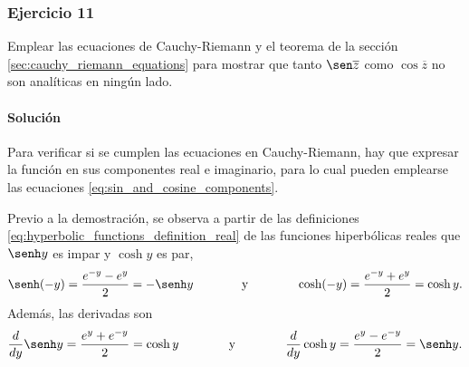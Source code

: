 \documentclass[a4paper]{report}
\begin{document}
\subsubsection{Ejercicio 11}

Emplear las ecuaciones de Cauchy-Riemann y el teorema de la sección \ref{sec:cauchy_riemann_equations} para mostrar que tanto \(\sen \overline{z}\) como \(\cos \overline{z}\) no son analíticas en ningún lado.

\paragraph{Solución} Para verificar si se cumplen las ecuaciones en Cauchy-Riemann, hay que expresar la función en sus componentes real e imaginario, para lo cual pueden emplearse las ecuaciones \ref{eq:sin_and_cosine_components}. 

Previo a la demostración, se observa a partir de las definiciones \ref{eq:hyperbolic_functions_definition_real} de las funciones hiperbólicas reales que \(\senh y\) es impar y \(\cosh y\) es par,
\[
 \senh(-y)=\frac{e^{-y}-e^{y}}{2}=-\senh y
 \qquad\qquad\textrm{y}\qquad\qquad
 \cosh(-y)=\frac{e^{-y}+e^{y}}{2}=\cosh y.
\]
Además, las derivadas son 
\[
 \frac{d}{dy}\senh y=\frac{e^y+e^{-y}}{2}=\cosh y
 \qquad\qquad\textrm{y}\qquad\qquad
 \frac{d}{dy}\cosh y=\frac{e^y-e^{-y}}{2}=\senh y.
\]
\end{document}
